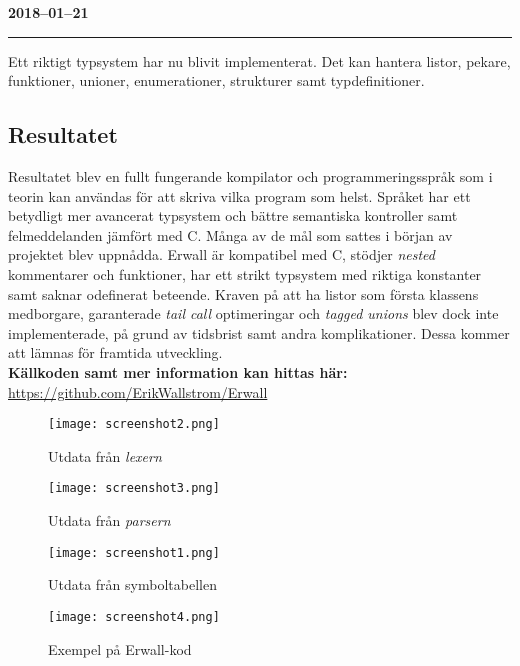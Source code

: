 \documentclass{theme}
\begin{document}
\noindent\textbf{2018--01--21}\\
\noindent\rule{\textwidth}{1pt}

\noindent
Ett riktigt typsystem har nu blivit implementerat. Det kan hantera listor,
pekare, funktioner, unioner, enumerationer, strukturer samt typdefinitioner.\\

\subsection{Resultatet}

\noindent Resultatet blev en fullt fungerande kompilator och programmeringsspråk
som i teorin kan användas för att skriva vilka program som helst. Språket har
ett betydligt mer avancerat typsystem och bättre semantiska kontroller samt
felmeddelanden jämfört med C. Många av de mål som sattes i början av projektet
blev uppnådda. Erwall är kompatibel med C, stödjer \textit{nested} kommentarer
och funktioner, har ett strikt typsystem med riktiga konstanter samt saknar
odefinerat beteende. Kraven på att ha listor som första klassens medborgare,
garanterade \textit{tail call} optimeringar och \textit{tagged unions} blev dock
inte implementerade, på grund av tidsbrist samt andra komplikationer. Dessa 
kommer att lämnas för framtida utveckling. \\

\noindent\textbf{Källkoden samt mer information kan hittas här: }\\
\url{https://github.com/ErikWallstrom/Erwall}\\

\begin{figure}
	\centering
	\texttt{[image: screenshot2.png]}
	\caption{Utdata från \textit{lexern}}
\end{figure}

\begin{figure}
	\centering
	\texttt{[image: screenshot3.png]}
	\caption{Utdata från \textit{parsern}}
\end{figure}

\begin{figure}
	\centering
	\texttt{[image: screenshot1.png]}
	\caption{Utdata från symboltabellen}
\end{figure}

\begin{figure}
	\centering
	\texttt{[image: screenshot4.png]}
	\caption{Exempel på Erwall-kod}
\end{figure}
\end{document}
